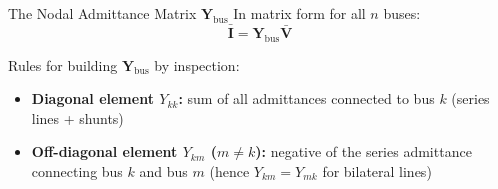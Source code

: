 \begin{frame}[allowframebreaks]{The Nodal Admittance Matrix $\mathbf{Y}_{\text{bus}}$}
    In matrix form for all $n$ buses:
    \begin{equation}
        \mathbf{\bar{I}} = \mathbf{Y}_{\text{bus}} \mathbf{\bar{V}} \label{eq:bus_inj_mat}
    \end{equation}

    \begin{block}{Rules for building $\mathbf{Y}_{\text{bus}}$ by inspection:}
        \begin{itemize}
            \item \textbf{Diagonal element $Y_{kk}$:} sum of all admittances connected to bus $k$ (series lines + shunts)
            \item \textbf{Off-diagonal element $Y_{km}$ ($m \neq k$):} negative of the series admittance connecting bus $k$ and bus $m$ (hence $Y_{km} = Y_{mk}$ for bilateral lines)
        \end{itemize}
    \end{block}
    \end{frame}

